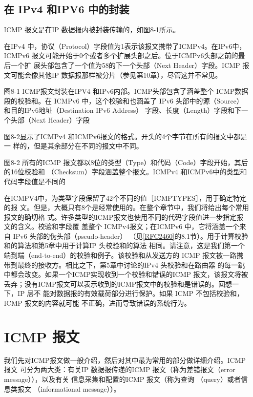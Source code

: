 \subsection{在 IPv4 和IPV6 中的封装}
ICMP 报文是在IP 数据报内被封装传输的，如图8-1所示。

在IPv4 中，协议（Protocol）字段值为1表示该报文携带了ICMPv4。在IPv6中，
ICMPv6 报文可能开始于0个或者多个扩展头部之后。位于ICMPv6头部之前的最后一个扩
展头部包含了一个值为58的下一个头部（Next Header）字段。ICMP 报文可能会像其他IP
数据报那样被分片（参见第10章），尽管这并不常见。

图8-1 ICMP报文封装在IPV4 和IPv6内部。ICMP头部包含了涵盖整个 ICMP数据段的校验和。在
ICMPv6 中，这个校验和也涵盖了 IPv6 头部中的源（Source）和目的IPv6地址（Destination
IPv6 Address） 字段、长度（Length）字段和下一个头部（Next Header）字段

图8-2显示了ICMPv4 和ICMPv6报文的格式。开头的4个字节在所有的报文中都是一
样的，但是其余部分在不同的报文中不同。

图8-2 所有的ICMP 报文都以8位的类型（Type）和代码（Code）字段开始，其后的16位校验和
（Checksum）字段涵盖整个报文。ICMPv4 和ICMPv6中的类型和代码字段值是不同的

在ICMPV4中，为类型字段保留了42个不同的值［ICMPTYPES］，用于确定特定的报
文。但是，大概只有8个是经常使用的。在整个章节中，我们将给出每个常用报文的确切格
式。许多类型的ICMP报文也使用不同的代码字段值进一步指定报文的含义。校验和字段覆
盖整个 ICMPv4报文；在ICMPv6 中，它将涵盖一个来自 IPv6 头部的伪头部（pseudo-header）
（见\href{https://www.rfc-editor.org/rfc/rfc2460}{[RFC2460]}的8.1节）。用于计算校验和的算法和第5章中用于计算IP 头校验和的算法
相同。请注意，这是我们第一个端到端（end-to-end）的校验和例子。该校验和从发送方的
ICMP 报文被一路携带到最终的接收方。相比之下，第5章中讨论的IPv4 头校验和在路由器
的每一跳中都会改变。如果一个ICMP实现收到一个校验和错误的ICMP 报文，该报文将被
丢弃；没有ICMP报文可以表示收到的ICMP报文中的校验和是错误的。回想一下，IP 层不
能对数据报的有效载荷部分进行保护。如果 ICMP 不包括校验和，ICMP 报文的内容就可能
不正确，进而导致错误的系统行为。

\section{ICMP 报文}

我们先对ICMP报文做一般介绍，然后对其中最为常用的部分做详细介绍。ICMP报文
可分为两大类：有关IP 数据报传递的ICMP 报文（称为差错报文（error message）），以及有关
信息采集和配置的ICMP 报文（称为查询 （query）或者信息类报文 （informational message））。
